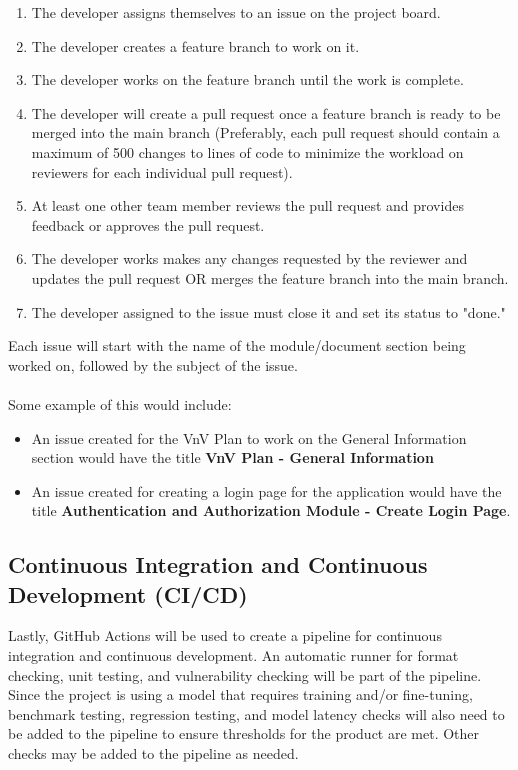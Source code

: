 \documentclass{article}
\begin{document}
\begin{enumerate}
  \item The developer assigns themselves to an issue on the project board.
  \item The developer creates a feature branch to work on it.
  \item The developer works on the feature branch until the work is complete.
  \item The developer will create a pull request once a feature branch is ready to be merged into the main branch (Preferably, each pull request should contain a maximum of 500 changes to lines of code to minimize the workload on reviewers for each individual pull request).
  \item At least one other team member reviews the pull request and provides feedback or approves the pull request.
  \item The developer works makes any changes requested by the reviewer and updates the pull request OR merges the feature branch into the main branch.
  \item The developer assigned to the issue must close it and set its status to "done." 
\end{enumerate}
Each issue will start with the name of the module/document section being worked on, followed by the subject of the issue.\\\\
Some example of this would include:
\begin{itemize}
    \item An issue created for the VnV Plan to work on the General Information section would have the title \textbf{VnV Plan - General Information}
    \item An issue created for creating a login page for the application would have the title \textbf{Authentication and Authorization Module - Create Login Page}.
\end{itemize}
\subsection{Continuous Integration and Continuous Development (CI/CD)}
Lastly, GitHub Actions will be used to create a pipeline for continuous integration and continuous development. An automatic runner for format checking, unit testing, and vulnerability checking will be part of the pipeline. Since the project is using a model that requires training and/or fine-tuning, benchmark testing, regression testing, and model latency checks will also need to be added to the pipeline to ensure thresholds for the product are met. Other checks may be added to the pipeline as needed.
\end{document}

